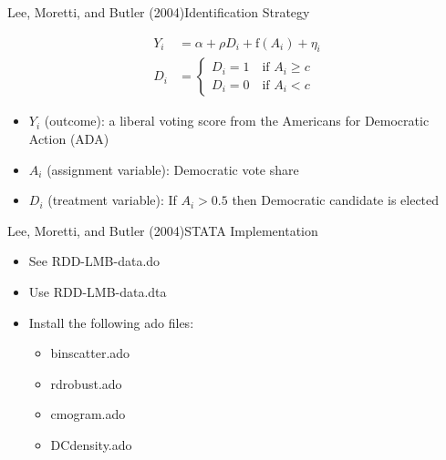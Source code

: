 \documentclass[dvipsnames,hyperref={pdfpagelabels=false}]{beamer}
\begin{document}
\begin{frame}{Lee, Moretti, and Butler (2004)}{Identification Strategy}
	
	\begin{equation*}
	\begin{aligned}
	Y_i&=\alpha+\rho D_i+\mathrm{f}(A_i)+\eta_i \\ 
	D_i&=\left\lbrace
	\begin{array}{l}
	D_i=1\quad \text{if $A_i\geq c$}\\
	D_i=0\quad \text{if $A_i<c$}
	\end{array}\right.
	\end{aligned}
	\end{equation*}
	
	
	\begin{itemize}
		\item $Y_{i}$ (outcome): a liberal voting score from the Americans for Democratic Action (ADA)
		\vspace{0.2cm}
		\item $A_{i}$ (assignment variable): Democratic vote share
		\vspace{0.2cm}
		\item $D_{i}$ (treatment variable): If $A_{i}>0.5$ then
		Democratic candidate is elected
	\end{itemize}
\end{frame}



\begin{frame}{Lee, Moretti, and Butler (2004)}{STATA Implementation}
	\begin{itemize}
		\item See RDD-LMB-data.do
		\vspace{0.2cm}
		\item Use RDD-LMB-data.dta
		\vspace{0.2cm}
		\item Install the following ado files:
		\begin{itemize}
			\vspace{0.2cm}
			\item binscatter.ado 
			\item rdrobust.ado 
			\item cmogram.ado
			\item DCdensity.ado
			
		\end{itemize}
		
	\end{itemize}
\end{frame}
\end{document}
